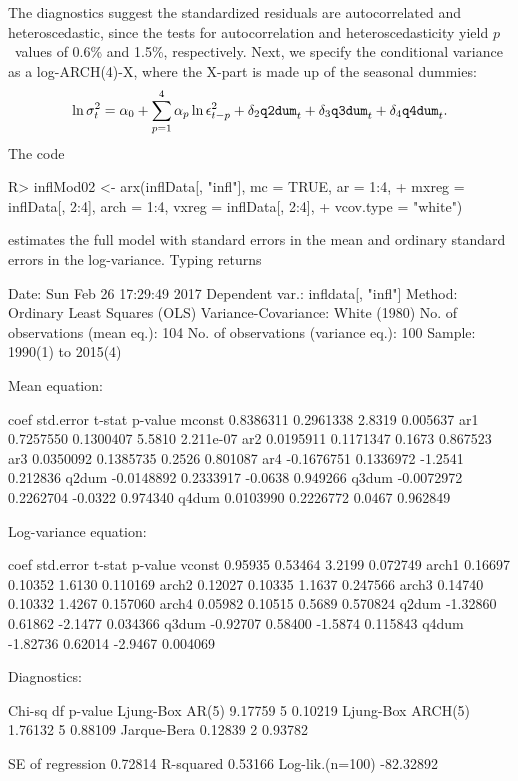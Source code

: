 \documentclass[article,nojss]{jss}
\begin{document}
%
The diagnostics suggest the standardized residuals are autocorrelated and heteroscedastic, since the tests for autocorrelation and heteroscedasticity yield $p$~values of 0.6\% and 1.5\%, respectively. Next, we specify the conditional variance as a log-ARCH(4)-X, where the X-part is made up of the seasonal dummies:
%
\begin{equation}
	\ln\sigma_t^2 = \alpha_0 + \sum_{p=1}^4 \alpha_p \ln\epsilon_{t-p}^2 + \delta_2 \verb|q2dum|_{t} + \delta_3 \verb|q3dum|_{t} + \delta_4 \verb|q4dum|_{t}.
\end{equation}
%
The code
%
\begin{CodeChunk}
\begin{CodeInput}
R> inflMod02 <- arx(inflData[, "infl"], mc = TRUE, ar = 1:4,
+    mxreg = inflData[, 2:4], arch = 1:4, vxreg = inflData[, 2:4],
+    vcov.type = "white")
\end{CodeInput}
\end{CodeChunk}
%
estimates the full model with \cite{White80} standard errors in the mean and ordinary standard errors in the log-variance. Typing  returns
%
\begin{CodeChunk}
\begin{CodeOutput}
Date: Sun Feb 26 17:29:49 2017 
Dependent var.: infldata[, "infl"] 
Method: Ordinary Least Squares (OLS) 
Variance-Covariance: White (1980) 
No. of observations (mean eq.): 104 
No. of observations (variance eq.): 100 
Sample: 1990(1) to 2015(4) 

Mean equation:

             coef  std.error  t-stat   p-value
mconst  0.8386311  0.2961338  2.8319  0.005637
ar1     0.7257550  0.1300407  5.5810 2.211e-07
ar2     0.0195911  0.1171347  0.1673  0.867523
ar3     0.0350092  0.1385735  0.2526  0.801087
ar4    -0.1676751  0.1336972 -1.2541  0.212836
q2dum  -0.0148892  0.2333917 -0.0638  0.949266
q3dum  -0.0072972  0.2262704 -0.0322  0.974340
q4dum   0.0103990  0.2226772  0.0467  0.962849

Log-variance equation:

           coef std.error  t-stat  p-value
vconst  0.95935   0.53464  3.2199 0.072749
arch1   0.16697   0.10352  1.6130 0.110169
arch2   0.12027   0.10335  1.1637 0.247566
arch3   0.14740   0.10332  1.4267 0.157060
arch4   0.05982   0.10515  0.5689 0.570824
q2dum  -1.32860   0.61862 -2.1477 0.034366
q3dum  -0.92707   0.58400 -1.5874 0.115843
q4dum  -1.82736   0.62014 -2.9467 0.004069

Diagnostics:

                   Chi-sq df p-value
Ljung-Box AR(5)   9.17759  5 0.10219
Ljung-Box ARCH(5) 1.76132  5 0.88109
Jarque-Bera       0.12839  2 0.93782

SE of regression   0.72814
R-squared          0.53166
Log-lik.(n=100)  -82.32892
\end{CodeOutput}
\end{CodeChunk}
\end{document}
